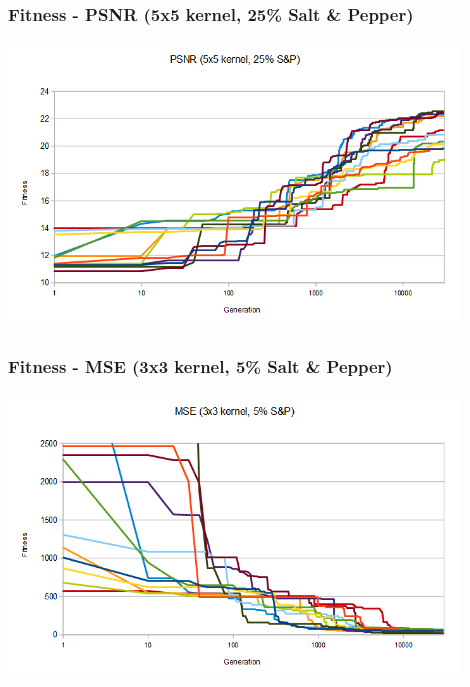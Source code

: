 \documentclass{beamer}
\begin{document}
	\begin{frame}[t,fragile]
	\frametitle{Fitness - PSNR (5x5 kernel, 25\% Salt \& Pepper)}					
	\begin{center}
	\includegraphics[width=0.9\textwidth]{img/psnr_5x5_25sp.png}
	
	\end{center}
	\end{frame}
	

	\begin{frame}[t,fragile]
	\frametitle{Fitness - MSE (3x3 kernel, 5\% Salt \& Pepper)}					
	\begin{center}
	\includegraphics[width=0.9\textwidth]{img/mse_3x3_5sp.png}
	
	\end{center}
	\end{frame}
	
\end{document}
